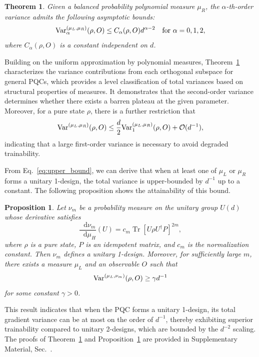 \documentclass[%
 reprint,
 superscriptaddress,
 amsmath,amssymb,
 aps, prl, twocolumn, showpacs,
]{revtex4-2}
\newtheorem{theorem}{Theorem}
\newtheorem{proposition}{Proposition}
\newcommand{\RomanNumeralCaps}[1]
    {\MakeUppercase{\romannumeral #1}}
\newcommand*{\dif}{\mathop{}\!\mathrm{d}}
\begin{document}
\begin{theorem}
    Given a balanced probability polynomial measure $\mu_R$, the $\alpha$-th-order variance admits the following asymptotic bounds:
    \begin{equation}
        {\rm Var}^{(\mu_L,\mu_R)}_\alpha(\rho, O) \leq C_\alpha(\rho, O)d^{\alpha-2}\quad {\rm for}\ \alpha=0,1,2,
    \end{equation}
    where $C_\alpha(\rho, O)$ is a constant independent on $d$.
    \label{thm:1}
\end{theorem}
Building on the uniform approximation by polynomial measures, Theorem~\ref{thm:1} characterizes the variance contributions from each orthogonal subspace for general PQCs, which provides a level classification of total variances based on structural properties of measures. It demonstrates that the second-order variance determines whether there exists a barren plateau at the given parameter. Moreover, for a pure state $\rho$, there is a further restriction that
    \begin{equation}
        {\rm Var}^{(\mu_L,\mu_R)}(\rho, O) \leq \frac{d}{2}{\rm Var}^{(\mu_L,\mu_R)}_1(\rho, O) + \mathcal{O}(d^{-1}),
        \label{eq:upper_bound}
    \end{equation}
   indicating that a large first-order variance is necessary to avoid degraded trainability.

From Eq.~\eqref{eq:upper_bound}, we can derive that when at least one of $\mu_L$ or $\mu_R$ forms a unitary 1-design, the total variance is upper-bounded by $d^{-1}$ up to a constant. The following proposition shows the attainability of this bound.
\begin{proposition}
   Let $\nu_m$ be a probability measure on the unitary group $ U(d)$ whose derivative satisfies
\begin{equation}
    \frac{\dif\nu_m}{\dif\mu_H}(U) = c_m\operatorname{Tr}[U\rho U^\dagger P]^{2m},
    \label{eq:1-design}
\end{equation}
where $\rho$ is a pure state, $P$ is an idempotent matrix, and $c_m$ is the normalization constant. Then $\nu_m$ defines a unitary 1-design. Moreover, for sufficiently large $m$, there exists a measure $\mu_L$ and an observable $O$ such that 
\begin{equation}
    {\rm Var}^{(\mu_L,\nu_m)}(\rho, O)\geq \gamma d^{-1}
\end{equation}
for some constant $\gamma>0$.
\label{prop:1-design}
\end{proposition}
This result indicates that when the PQC forms a unitary 1-design, its total gradient variance can be at most on the order of \(d^{-1}\), thereby exhibiting superior trainability compared to unitary 2-designs, which are bounded by the $d^{-2}$ scaling. The proofs of Theorem~\ref{thm:1} and Proposition~\ref{prop:1-design} are provided in Supplementary Material, Sec.~\RomanNumeralCaps{3}.
\end{document}
